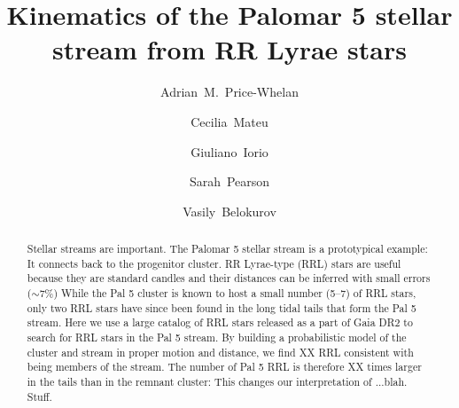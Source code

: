 \documentclass[twocolumn]{aastex63}
\begin{document}
\title{Kinematics of the Palomar 5 stellar stream from RR Lyrae stars}

\author[0000-0003-0872-7098]{Adrian~M.~Price-Whelan}

\author[0000-0002-6330-2394]{Cecilia~Mateu}


\author{Giuliano~Iorio}

\author{Sarah~Pearson}

\author{Vasily~Belokurov}



\begin{abstract}
Stellar streams are important.
The Palomar 5 stellar stream is a prototypical example: It connects back to the progenitor cluster.
RR Lyrae-type (RRL) stars are useful because they are standard candles and their distances can be inferred with small errors ($\sim7\%$)
While the Pal 5 cluster is known to host a small number (5--7) of RRL stars, only two RRL stars have since been found in the long tidal tails that form the Pal 5 stream.
Here we use a large catalog of RRL stars released as a part of Gaia DR2 to search for RRL stars in the Pal 5 stream.
By building a probabilistic model of the cluster and stream in proper motion and distance, we find XX RRL consistent with being members of the stream.
The number of Pal 5 RRL is therefore XX times larger in the tails than in the remnant cluster: This changes our interpretation of ...blah.
Stuff.
\end{abstract}

\end{document}
